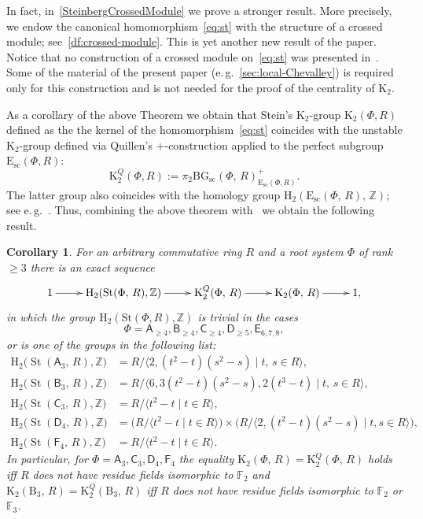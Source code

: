 \documentclass[oneside, 11pt]{amsart}
\numberwithin{equation}{section}
\newtheorem*{corollary*}{Corollary}
\theoremstyle{definition}
\theoremstyle{remark}
\DeclareMathOperator\St{St}
\newcommand{\ZZ}{\mathbb{Z}}
\newcommand{\rA}{\mathsf{A}}
\newcommand{\rB}{\mathsf{B}}
\newcommand{\rC}{\mathsf{C}}
\newcommand{\rD}{\mathsf{D}}
\newcommand{\rE}{\mathsf{E}}
\newcommand{\rF}{\mathsf{F}}
\begin{document}
In fact, in~\cref{SteinbergCrossedModule} we prove a stronger result. More precisely, we endow the canonical homomorphism~\eqref{eq:st} with the structure of a crossed module; see~\cref{df:crossed-module}. This is yet another new result of the paper. Notice that no construction of a crossed module on~\eqref{eq:st} was presented in~\cite{Lav, Sin, LavSin}. Some of the material of the present paper (e.\,g.~\cref{sec:local-Chevalley}) is required only for this construction and is not needed for the proof of the centrality of $\mathrm K_2$.

As a corollary of the above Theorem we obtain that Stein's $\mathrm K_2$-group $\mathrm{K}_2(\Phi, R)$ defined as the the kernel of the homomorphism~\eqref{eq:st} coincides with the unstable $\mathrm{K}_2$-group defined via Quillen's $+$-construction applied to the perfect subgroup $\mathrm{E}_{\mathrm{sc}}(\Phi, R)$: \[ \mathrm{K}_2^Q(\Phi, R) := \pi_2\mathrm{BG}_{\mathrm{sc}}(\Phi,\,R)^+_{\mathrm{E}_{\mathrm{sc}}(\Phi, R)}.\] The latter group also coincides with the homology group $\mathrm H_2(\mathrm E_{\mathrm{sc}}(\Phi,\,R),\,\mathbb Z)$; see e.\,g.~\cite[\S~IV.1]{Weibel}.
Thus, combining the above theorem with~\cite{St71,vdKStein} we obtain the following result.
\begin{corollary*}
For an arbitrary commutative ring $R$ and a root system $\Phi$ of rank $\geq 3$ there is an exact sequence \[ \xymatrix{ 1\ar@{->}[r]&{\mathrm H_2(\St(\Phi,\,R),\ZZ)}\ar@{->}[r]&\mathrm K_2^Q(\Phi,\,R)\ar@{->}[r]&\mathrm K_2(\Phi,\,R)\ar@{->}[r]&1,}\] in which the group $\mathrm H_2(\mathrm{St}(\Phi, R), \ZZ)$ is trivial in the cases 
\[\Phi= \rA_{\geq 4},\rB_{\geq 4},\rC_{\geq 4}, \rD_{\geq 5}, \rE_{6,7,8},\] or is one of the groups in the following list:
\begin{align*}
\mathrm H_2\big(\St(\rA_3,\,R),\ZZ\big)&=R/\langle2, (t^2-t)(s^2-s)\mid t,\,s\in R\rangle,\\
\mathrm H_2\big(\St(\rB_3,\,R),\ZZ\big)&=R/\langle6, 3(t^2-t)(s^2-s), 2(t^3-t)\mid t,\,s\in R\rangle,\\
\mathrm H_2\big(\St(\rC_3,\,R),\ZZ\big)&=R/\langle t^2-t\mid t\in R\rangle,\\
\mathrm H_2\big(\St(\rD_4,\,R),\ZZ\big)&=\big(R/\langle t^2-t\mid t\in R\rangle\big)\times\big(R/\langle2,(t^2-t)(s^2-s)\mid t,s\in R\rangle\big),\\
\mathrm H_2\big(\St(\rF_4,\,R),\ZZ\big)&=R/\langle t^2-t\mid t\in R\rangle.
\end{align*}
In particular, for $\Phi=\rA_3,\rC_3,\rD_4,\rF_4$ the equality $\mathrm K_2(\Phi,\,R)=\mathrm K_2^Q(\Phi,\,R)$ holds iff $R$ does not have residue fields isomorphic to $\mathbb F_2$ and $\mathrm K_2(\mathrm B_3,\,R)=\mathrm K_2^Q(\mathrm B_3,\,R)$ iff $R$ does not have residue fields isomorphic to $\mathbb F_2$ or $\mathbb F_3$.
\end{corollary*}
\end{document}
